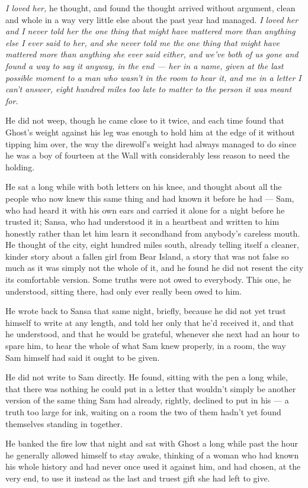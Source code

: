 \textit{I loved her,} he thought, and found the thought arrived without argument, clean and whole in a way very little else about the past year had managed. \textit{I loved her and I never told her the one thing that might have mattered more than anything else I ever said to her, and she never told me the one thing that might have mattered more than anything she ever said either, and we’ve both of us gone and found a way to say it anyway, in the end — her in a name, given at the last possible moment to a man who wasn’t in the room to hear it, and me in a letter I can’t answer, eight hundred miles too late to matter to the person it was meant for.}

\sceneBreak

He did not weep, though he came close to it twice, and each time found that Ghost’s weight against his leg was enough to hold him at the edge of it without tipping him over, the way the direwolf’s weight had always managed to do since he was a boy of fourteen at the Wall with considerably less reason to need the holding.

He sat a long while with both letters on his knee, and thought about all the people who now knew this same thing and had known it before he had — Sam, who had heard it with his own ears and carried it alone for a night before he trusted it; Sansa, who had understood it in a heartbeat and written to him honestly rather than let him learn it secondhand from anybody’s careless mouth. He thought of the city, eight hundred miles south, already telling itself a cleaner, kinder story about a fallen girl from Bear Island, a story that was not false so much as it was simply not the whole of it, and he found he did not resent the city its comfortable version. Some truths were not owed to everybody. This one, he understood, sitting there, had only ever really been owed to him.

\sceneBreak

He wrote back to Sansa that same night, briefly, because he did not yet trust himself to write at any length, and told her only that he’d received it, and that he understood, and that he would be grateful, whenever she next had an hour to spare him, to hear the whole of what Sam knew properly, in a room, the way Sam himself had said it ought to be given.

He did not write to Sam directly. He found, sitting with the pen a long while, that there was nothing he could put in a letter that wouldn’t simply be another version of the same thing Sam had already, rightly, declined to put in his — a truth too large for ink, waiting on a room the two of them hadn’t yet found themselves standing in together.

He banked the fire low that night and sat with Ghost a long while past the hour he generally allowed himself to stay awake, thinking of a woman who had known his whole history and had never once used it against him, and had chosen, at the very end, to use it instead as the last and truest gift she had left to give.